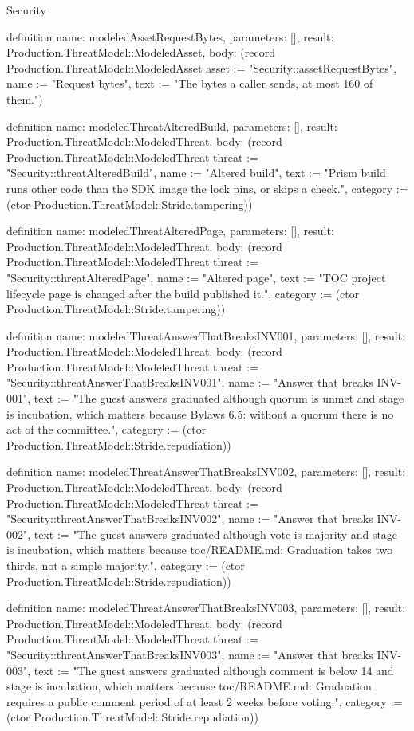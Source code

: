 \begin{lexlean}{Security}
\begin{semanticmodule}
definition{
  name: modeledAssetRequestBytes,
  parameters: [],
  result: Production.ThreatModel::ModeledAsset,
  body: (record Production.ThreatModel::ModeledAsset {asset := "Security::assetRequestBytes", name := "Request bytes", text := "The bytes a caller sends, at most 160 of them."})
}

definition{
  name: modeledThreatAlteredBuild,
  parameters: [],
  result: Production.ThreatModel::ModeledThreat,
  body: (record Production.ThreatModel::ModeledThreat {threat := "Security::threatAlteredBuild", name := "Altered build", text := "Prism build runs other code than the SDK image the lock pins, or skips a check.", category := (ctor Production.ThreatModel::Stride.tampering)})
}

definition{
  name: modeledThreatAlteredPage,
  parameters: [],
  result: Production.ThreatModel::ModeledThreat,
  body: (record Production.ThreatModel::ModeledThreat {threat := "Security::threatAlteredPage", name := "Altered page", text := "TOC project lifecycle page is changed after the build published it.", category := (ctor Production.ThreatModel::Stride.tampering)})
}

definition{
  name: modeledThreatAnswerThatBreaksINV001,
  parameters: [],
  result: Production.ThreatModel::ModeledThreat,
  body: (record Production.ThreatModel::ModeledThreat {threat := "Security::threatAnswerThatBreaksINV001", name := "Answer that breaks INV-001", text := "The guest answers graduated although quorum is unmet and stage is incubation, which matters because Bylaws 6.5: without a quorum there is no act of the committee.", category := (ctor Production.ThreatModel::Stride.repudiation)})
}

definition{
  name: modeledThreatAnswerThatBreaksINV002,
  parameters: [],
  result: Production.ThreatModel::ModeledThreat,
  body: (record Production.ThreatModel::ModeledThreat {threat := "Security::threatAnswerThatBreaksINV002", name := "Answer that breaks INV-002", text := "The guest answers graduated although vote is majority and stage is incubation, which matters because toc/README.md: Graduation takes two thirds, not a simple majority.", category := (ctor Production.ThreatModel::Stride.repudiation)})
}

definition{
  name: modeledThreatAnswerThatBreaksINV003,
  parameters: [],
  result: Production.ThreatModel::ModeledThreat,
  body: (record Production.ThreatModel::ModeledThreat {threat := "Security::threatAnswerThatBreaksINV003", name := "Answer that breaks INV-003", text := "The guest answers graduated although comment is below 14 and stage is incubation, which matters because toc/README.md: Graduation requires a public comment period of at least 2 weeks before voting.", category := (ctor Production.ThreatModel::Stride.repudiation)})
}


\end{semanticmodule}
\end{lexlean}
